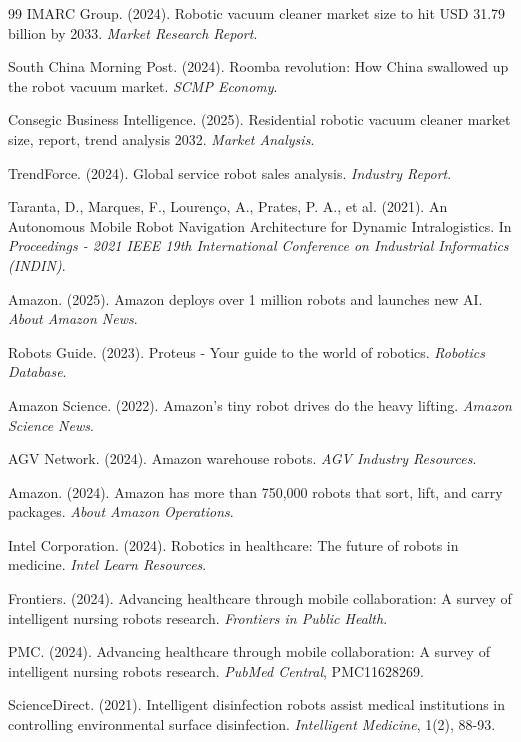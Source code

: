 \begin{thebibliography}{99}
IMARC Group. (2024). Robotic vacuum cleaner market size to hit USD 31.79 billion by 2033. \textit{Market Research Report}.

South China Morning Post. (2024). Roomba revolution: How China swallowed up the robot vacuum market. \textit{SCMP Economy}.

Consegic Business Intelligence. (2025). Residential robotic vacuum cleaner market size, report, trend analysis 2032. \textit{Market Analysis}.

TrendForce. (2024). Global service robot sales analysis. \textit{Industry Report}.

Taranta, D., Marques, F., Lourenço, A., Prates, P. A., et al. (2021). An Autonomous Mobile Robot Navigation Architecture for Dynamic Intralogistics. In \textit{Proceedings - 2021 IEEE 19th International Conference on Industrial Informatics (INDIN)}.



Amazon. (2025). Amazon deploys over 1 million robots and launches new AI. \textit{About Amazon News}.

Robots Guide. (2023). Proteus - Your guide to the world of robotics. \textit{Robotics Database}.

Amazon Science. (2022). Amazon's tiny robot drives do the heavy lifting. \textit{Amazon Science News}.

AGV Network. (2024). Amazon warehouse robots. \textit{AGV Industry Resources}.

Amazon. (2024). Amazon has more than 750,000 robots that sort, lift, and carry packages. \textit{About Amazon Operations}.

Intel Corporation. (2024). Robotics in healthcare: The future of robots in medicine. \textit{Intel Learn Resources}.

Frontiers. (2024). Advancing healthcare through mobile collaboration: A survey of intelligent nursing robots research. \textit{Frontiers in Public Health}.

PMC. (2024). Advancing healthcare through mobile collaboration: A survey of intelligent nursing robots research. \textit{PubMed Central}, PMC11628269.

ScienceDirect. (2021). Intelligent disinfection robots assist medical institutions in controlling environmental surface disinfection. \textit{Intelligent Medicine}, 1(2), 88-93.


\end{thebibliography}
